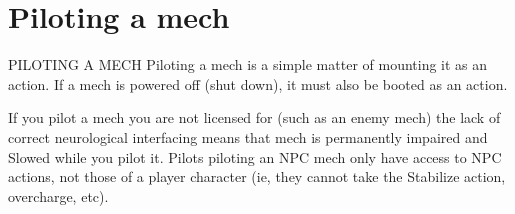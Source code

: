\section{Piloting a mech}
                                        PILOTING A MECH
Piloting a mech is a simple matter of mounting it as an action. If a mech is powered off (shut
down), it must also be booted as an action.


If you pilot a mech you are not licensed for (such as an enemy mech) the lack of correct
neurological interfacing means that mech is permanently impaired and Slowed while you pilot it.
Pilots piloting an NPC mech only have access to NPC actions, not those of a player character (ie,
they cannot take the Stabilize action, overcharge, etc).

